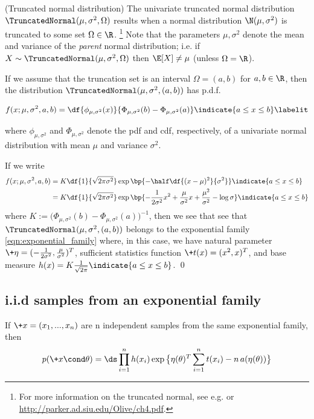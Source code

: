 \documentclass{article} %
\begin{document}
\begin{example}{(Truncated normal distribution)} 
\label{ex:truncated_normal_as_ef} The univariate truncated normal distribution $\TruncatedNormal(\mu,  \sigma^2,  \Omega)$ results when a normal distribution $\N(\mu,  \sigma^2)$ is truncated to some set $\Omega \in \R$. \footnote{For more information on the truncated normal,  see e.g.  \cite{burkardt2014truncated} or \url{http://parker.ad.siu.edu/Olive/ch4.pdf}.}   Note that the parameters $\mu, \sigma^2$ denote the mean and variance of the \textit{parent} normal distribution;  i.e.  if $X \sim \TruncatedNormal(\mu,  \sigma^2,  \Omega)$ then $\E[X] \neq \mu$ (unless $\Omega = \R$). 

If we assume that the truncation set is an interval $\Omega = (a,b)$ for $a,b \in \R$,  then the distribution $\TruncatedNormal(\mu,  \sigma^2,  (a,b))$ has p.d.f.

\begin{align*}
f(x ; \mu,  \sigma^2,  a,  b) = \df{\phi_{\mu, \sigma^2} (x) }{\Phi_{\mu, \sigma^2} (b)  - \Phi_{\mu, \sigma^2} (a) } \indicate{a \leq x \leq b} \labelit \label{eqn:pdf_of_normal_truncated_to_an_interval}
\end{align*} 

where $\phi_{\mu,  \sigma^2}$ and $\Phi_{\mu,  \sigma^2}$ denote the pdf and cdf,  respectively,  of a univariate normal distribution with mean $\mu$ and variance $\sigma^2$.   

If we write
\begin{align*}
f(x ; \mu,  \sigma^2,  a,  b) & = K \df{1}{\sqrt{2 \pi \sigma^2}} \exp \bp{-\half \df{(x-\mu)^2}{\sigma^2}}  \indicate{a \leq x \leq b} \\
& = K \df{1}{\sqrt{2 \pi \sigma^2}} \exp \bp{ - \frac{1}{2 \sigma^2} x^2 + \frac{\mu}{\sigma^2} x  + \frac{\mu^2}{\sigma^2}  - \log \sigma}  \indicate{a \leq x \leq b} 
\end{align*} 
where $K := \big( \Phi_{\mu, \sigma^2} (b)  - \Phi_{\mu, \sigma^2} (a) \big)^{-1}$,  then we see that see that  $\TruncatedNormal(\mu,  \sigma^2,  (a,b))$ belongs to the exponential family \eqref{eqn:exponential_family} where,  in this case,  we have natural parameter $\+\eta = (- \frac{1}{2 \sigma^2},  \frac{\mu}{\sigma^2})^T$,  sufficient statistics function $\+t(x) = (x^2,  x)^T$,  and base measure $h(x) = K \frac{1}{\sqrt{2 \pi}}  \indicate{a \leq x \leq b}$.
\qed
\end{example}

\subsection{i.i.d samples from an exponential family}
If $\+x=(x_1, ..., x_n)$ are n independent samples from the same exponential family, then 
\begin{align}
\label{eqn:exponential_family_iid}
 p(\+x \cond \theta) = \ds\prod_{i=1}^n h(x_i) \exp \big\{ \eta(\theta)^T \sum_{i=1}^n t(x_i) - n \,a(\eta(\theta))\big\} 
 \end{align}
\end{document}
